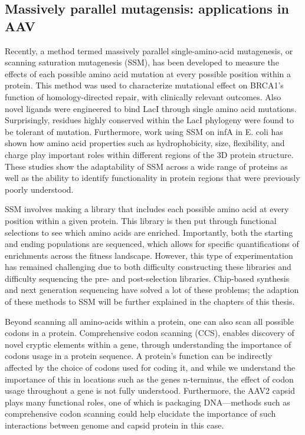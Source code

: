 \subsection{Massively parallel mutagensis: applications in AAV}

Recently, a method termed massively parallel single-amino-acid mutagenesis, or scanning saturation mutagenesis (SSM), has been developed to measure the effects of each possible amino acid mutation at every possible position within a protein\cite{Starita2015-uk,Kitzman2015-hu}. This method was used to characterize mutational effect on BRCA1’s function of homology-directed repair, with clinically relevant outcomes\cite{Starita2015-uk}. Also novel ligands were engineered to bind LacI through single amino acid mutations\cite{Taylor2016-wr}. Surprisingly, residues highly conserved within the LacI phylogeny were found to be tolerant of mutation. Furthermore, work using SSM on infA in E. coli has shown how amino acid properties such as hydrophobicity, size, flexibility, and charge play important roles within different regions of the 3D protein structure\cite{Kelsic2016-ai}. These studies show the adaptability of SSM across a wide range of proteins as well as the ability to identify functionality in protein regions that were previously poorly understood. 

SSM involves making a library that includes each possible amino acid at every position within a given protein. This library is then put through functional selections to see which amino acids are enriched. Importantly, both the starting and ending populations are sequenced, which allows for specific quantifications of enrichments across the fitness landscape. However, this type of experimentation has remained challenging due to both difficulty constructing these libraries and difficulty sequencing the pre- and post-selection libraries. Chip-based synthesis and next generation sequencing have solved a lot of these problems; the adaption of these methods to SSM will be further explained in the chapters of this thesis.   

Beyond scanning all amino-acids within a protein, one can also scan all possible codons in a protein\cite{Kelsic2016-ai}. Comprehensive codon scanning (CCS), enables discovery of novel cryptic elements within a gene, through understanding the importance of codons usage in a protein sequence. A protein’s function can be indirectly affected by the choice of codons used for coding it, and while we understand the importance of this in locations such as the genes n-terminus\cite{Kelsic2016-ai,Goodman2013-qb}, the effect of codon usage throughout a gene is not fully understood. Furthermore, the AAV2 capsid plays many functional roles, one of which is packaging DNA---methods such as comprehensive codon scanning could help elucidate the importance of such interactions between genome and capsid protein in this case.

